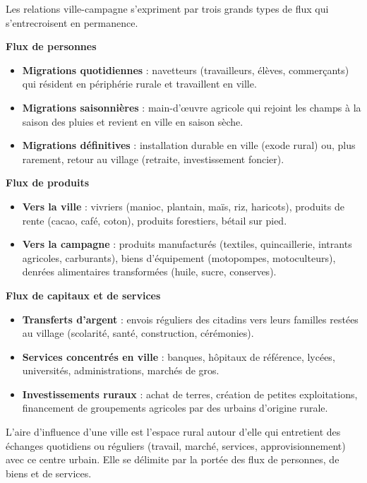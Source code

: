 \documentclass[11pt]{article}
\newcommand{\cle}[1]{{\popxbold\color{popdark}#1}}
\newcounter{popsec}
\newcounter{popsub}
\newcommand{\courssub}[1]{%
  \stepcounter{popsub}%
  \par\vspace{9pt}\noindent{\popxbold\fontsize{11.5}{13}\selectfont\color{popink}{\color{poporange}\thepopsec.\thepopsub}\hspace{6pt}#1}\par\nopagebreak\vspace{4pt}
}
\begin{document}
\courssub{Les flux entre ville et campagne}

Les relations ville-campagne s'expriment par trois grands types de flux qui s'entrecroisent en permanence.

\textbf{Flux de personnes}
\begin{itemize}
\item \textbf{Migrations quotidiennes} : navetteurs (travailleurs, élèves, commerçants) qui résident en périphérie rurale et travaillent en ville.
\item \textbf{Migrations saisonnières} : main-d'œuvre agricole qui rejoint les champs à la saison des pluies et revient en ville en saison sèche.
\item \textbf{Migrations définitives} : installation durable en ville (exode rural) ou, plus rarement, retour au village (retraite, investissement foncier).
\end{itemize}

\textbf{Flux de produits}
\begin{itemize}
\item \textbf{Vers la ville} : vivriers (manioc, plantain, maïs, riz, haricots), produits de rente (cacao, café, coton), produits forestiers, bétail sur pied.
\item \textbf{Vers la campagne} : produits manufacturés (textiles, quincaillerie, intrants agricoles, carburants), biens d'équipement (motopompes, motoculteurs), denrées alimentaires transformées (huile, sucre, conserves).
\end{itemize}

\textbf{Flux de capitaux et de services}
\begin{itemize}
\item \textbf{Transferts d'argent} : envois réguliers des citadins vers leurs familles restées au village (scolarité, santé, construction, cérémonies).
\item \textbf{Services concentrés en ville} : banques, hôpitaux de référence, lycées, universités, administrations, marchés de gros.
\item \textbf{Investissements ruraux} : achat de terres, création de petites exploitations, financement de groupements agricoles par des urbains d'origine rurale.
\end{itemize}

\begin{definition}
L'\cle{aire d'influence} d'une ville est l'espace rural autour d'elle qui entretient des échanges quotidiens ou réguliers (travail, marché, services, approvisionnement) avec ce centre urbain. Elle se délimite par la portée des flux de personnes, de biens et de services.
\end{definition}
\end{document}

